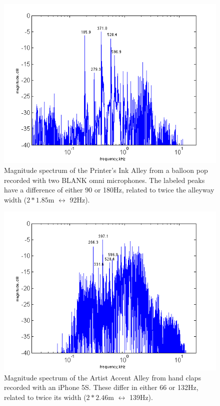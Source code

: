 \documentclass{aes137}
\begin{document}


\begin{figure}[h!] \centering \includegraphics[width=\linewidth]{images/printers_labeled_IR.png} 
\caption{Magnitude spectrum of the Printer's Ink Alley from
  a balloon pop recorded with two BLANK omni microphones. The labeled
  peaks have a difference of either 90 or 180Hz, related to twice the alleyway width
  ($2*1.85$m $\longleftrightarrow$ 92Hz).}
\end{figure}

\begin{figure}[h!] \centering \includegraphics[width=\linewidth]{images/artists_labeled_IR.png} 
\caption{Magnitude spectrum of the Artist Accent Alley from hand claps
  recorded with an iPhone 5S. These differ in either 66 or 132Hz,
  related to twice its width ($2*2.46$m $\longleftrightarrow$ 139Hz).}
\end{figure}
\end{document}
